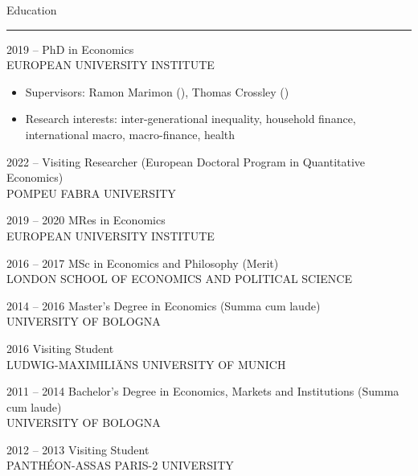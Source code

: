 \documentclass[5pt,a4paper]{article}
\begin{document}
\begin{cv}{}
\begin{cvlist}{Education}
	\hrule
	\item[\small 2019 -- ] \normalsize PhD in Economics\\
	\footnotesize EUROPEAN UNIVERSITY INSTITUTE
	\normalsize
	\begin{itemize}
	\item Supervisors: Ramon Marimon (), Thomas Crossley ()
	\item Research interests: inter-generational inequality, household finance, international macro, macro-finance, health
 \end{itemize}
 	\item[\small 2022 -- ] \normalsize Visiting Researcher (European Doctoral Program in Quantitative Economics)\\
	\footnotesize POMPEU FABRA UNIVERSITY
	\item[\small 2019 -- 2020] \normalsize MRes in Economics\\
	\footnotesize EUROPEAN UNIVERSITY INSTITUTE
	\item[\small 2016 -- 2017] \normalsize MSc in Economics and Philosophy (Merit)\\
	\footnotesize LONDON SCHOOL OF ECONOMICS AND POLITICAL SCIENCE
  \normalsize \item[\small 2014 -- 2016] \normalsize Master's Degree in Economics (Summa cum laude)\\
	\footnotesize UNIVERSITY OF BOLOGNA
    \normalsize \item[\small 2016] \normalsize Visiting Student \\ 
    \footnotesize  LUDWIG-MAXIMILI\"ANS UNIVERSITY OF MUNICH
	\normalsize \item[\small 2011 -- 2014] \normalsize Bachelor's Degree in Economics, Markets and Institutions (Summa cum laude)\\
	\footnotesize UNIVERSITY OF BOLOGNA
    \normalsize \item[\small 2012 -- 2013] \normalsize Visiting Student\\ 
    \footnotesize PANTH\'EON-ASSAS PARIS-2 UNIVERSITY 
  \end{cvlist}

  


\end{cv}
\end{document}
